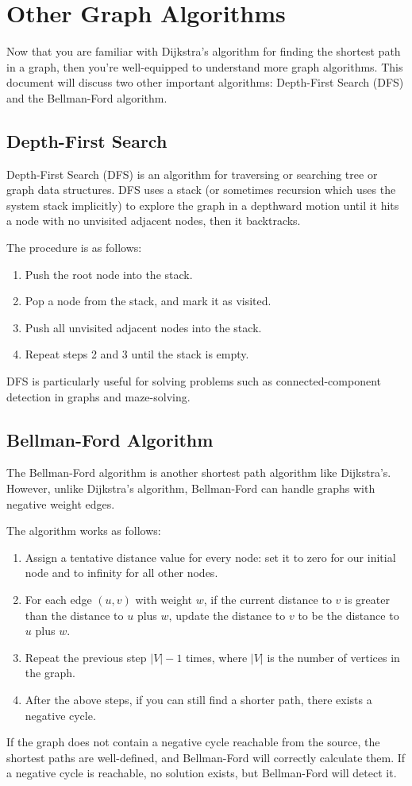 \chapter{Other Graph Algorithms}

Now that you are familiar with Dijkstra's algorithm for finding the
shortest path in a graph, then you're well-equipped to understand more
graph algorithms. This document will discuss two other important
algorithms: Depth-First Search (DFS) and the Bellman-Ford algorithm. 

\section{Depth-First Search}

Depth-First Search (DFS) is an algorithm for traversing or searching
tree or graph data structures. DFS uses a stack (or sometimes
recursion which uses the system stack implicitly) to explore the graph
in a depthward motion until it hits a node with no unvisited adjacent
nodes, then it backtracks.

The procedure is as follows:

\begin{enumerate}
    \item Push the root node into the stack.
    \item Pop a node from the stack, and mark it as visited.
    \item Push all unvisited adjacent nodes into the stack.
    \item Repeat steps 2 and 3 until the stack is empty.
\end{enumerate}

DFS is particularly useful for solving problems such as
connected-component detection in graphs and maze-solving.

\section{Bellman-Ford Algorithm}

The Bellman-Ford algorithm is another shortest path algorithm like
Dijkstra's. However, unlike Dijkstra's algorithm, Bellman-Ford can
handle graphs with negative weight edges.

The algorithm works as follows:

\begin{enumerate}
    \item Assign a tentative distance value for every node: set it to
      zero for our initial node and to infinity for all other nodes.
    \item For each edge $(u, v)$ with weight $w$, if the current
      distance to $v$ is greater than the distance to $u$ plus $w$,
      update the distance to $v$ to be the distance to $u$ plus $w$.
    \item Repeat the previous step $|V| - 1$ times, where $|V|$ is the
      number of vertices in the graph.
    \item After the above steps, if you can still find a shorter path,
      there exists a negative cycle.
\end{enumerate}

If the graph does not contain a negative cycle reachable from the
source, the shortest paths are well-defined, and Bellman-Ford will
correctly calculate them. If a negative cycle is reachable, no
solution exists, but Bellman-Ford will detect it.
